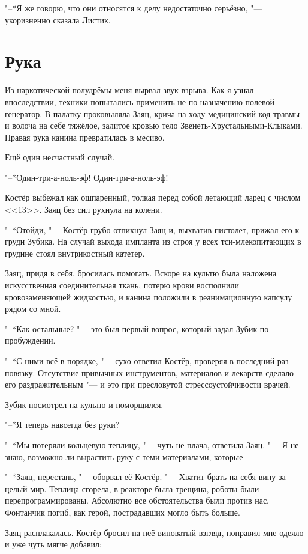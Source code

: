 \documentclass[a4paper,10pt]{book}
\newcommand{\ldotst}{\so{...}\xspace}
\begin{document}
"--*Я же говорю, что они относятся к делу недостаточно серьёзно, "--- 
укоризненно сказала Листик.

\section{Рука}

Из наркотической полудрёмы меня вырвал звук взрыва. Как я узнал впоследствии, 
техники попытались применить не по назначению полевой генератор. В палатку 
проковыляла Заяц, крича на ходу медицинский код травмы и волоча на себе 
тяжёлое, залитое кровью тело Звенеть-Хрустальными-Клыками. Правая рука канина 
превратилась в месиво.

Ещё один несчастный случай.

"--*Один-три-а-ноль-эф! Один-три-а-ноль-эф!

Костёр выбежал как ошпаренный, толкая перед собой летающий ларец с числом 
<<13>>. Заяц без сил рухнула на колени.

"--*Отойди, "--- Костёр грубо отпихнул Заяц и, выхватив пистолет, прижал его к 
груди Зубика. На случай выхода импланта из строя у всех тси-млекопитающих в 
грудине стоял внутрикостный катетер.

Заяц, придя в себя, бросилась помогать. Вскоре на культю была наложена 
искусственная соединительная ткань, потерю крови восполнили кровозаменяющей 
жидкостью, и канина положили в реанимационную капсулу рядом со мной.

"--*Как остальные? "--- это был первый вопрос, который задал Зубик по 
пробуждении.

"--*С ними всё в порядке, "--- сухо ответил Костёр, проверяя в последний раз 
повязку. Отсутствие привычных инструментов, материалов и лекарств сделало его 
раздражительным "--- и это при пресловутой стрессоустойчивости врачей.

Зубик посмотрел на культю и поморщился.

"--*Я теперь навсегда без руки?

"--*Мы потеряли кольцевую теплицу, "--- чуть не плача, ответила Заяц. "--- Я не 
знаю, возможно ли вырастить руку с теми материалами, которые\ldotst

"--*Заяц, перестань, "--- оборвал её Костёр. "--- Хватит брать на себя вину за 
целый мир. Теплица сгорела, в реакторе была трещина, роботы были 
перепрограммированы. Абсолютно все обстоятельства были против нас. Фонтанчик
погиб, как герой, пострадавших могло быть больше.

Заяц расплакалась. Костёр бросил на неё виноватый взгляд, поправил мне одеяло и 
уже чуть мягче добавил:
\end{document}
